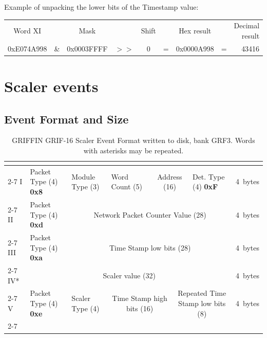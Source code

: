 \documentclass[letterpaper,12pt,notitlepage]{report}
\begin{document}
Example of unpacking the lower bits of the Timestamp value:\\

\begin{tabular}{ccccccccr}
Word XI &  & Mask & & Shift & & Hex result & & Decimal result\\
0xE074A998 & \& & 0x0003FFFF & $>>$ & 0 & = & 0x0000A998 & = & 43416\\
\end{tabular}


\chapter{Scaler events}

\section{Event Format and Size}

\begin{landscape}
\begin{table}
\caption{GRIFFIN GRIF-16 Scaler Event Format written to disk, bank GRF3. Words with asterisks may be repeated.}
\begin{tabular*}{\textwidth}{p{0.9cm}|p{2.7cm}|p{2.7cm}|p{2.7cm}|p{2.7cm}p{2.7cm}|p{2.7cm}|c}
\multicolumn{1}{l}{} & & & & & & & \\[\dimexpr-\normalbaselineskip-\arrayrulewidth]%
\cline{2-7}
I & Packet Type (4) {\bf 0x8} & Module Type (3) & Word Count (5) & \multicolumn{2}{c|}{Address (16)} & Det. Type (4) {\bf 0xF} & 4~bytes\\
\cline{2-7}
II & Packet Type (4) {\bf 0xd} & \multicolumn{5}{c|}{Network Packet Counter Value (28)} & 4~bytes\\
\cline{2-7}
III & Packet Type (4) {\bf 0xa} & \multicolumn{5}{c|}{Time Stamp low bits (28)} & 4~bytes\\
\cline{2-7}
IV* & \multicolumn{6}{c|}{Scaler value (32)} & 4~bytes\\
\cline{2-7}
V & Packet Type (4) {\bf 0xe} & Scaler Type (4) & \multicolumn{2}{c|}{Time Stamp high bits (16)} & \multicolumn{2}{c|}{Repeated Time Stamp low bits (8)} & 4~bytes\\
\cline{2-7}
\end{tabular*}
\end{table}
\end{landscape}
\end{document}
